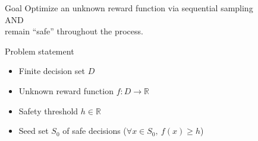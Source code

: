 \documentclass[xetex,10pt,mathserif,handout]{beamer}
\newlength\figureheight
\newlength\figurewidth
\begin{document}

\begin{frame}{Goal}
\centering
\large
Optimize an unknown reward function via sequential sampling\\[1em]
AND\\[1em]
remain ``safe'' throughout the process.
\end{frame}

\begin{frame}{Problem statement}
\begin{itemize}
\item<1-> Finite decision set $D$
\vspace{0.5em}
\item<1-> Unknown reward function $f : D \to \mathbb{R}$
\vspace{0.5em}
\item<2-> Safety threshold $h \in \mathbb{R}$
\vspace{0.5em}
\item<4-> Seed set $S_0$ of safe decisions ($\forall x \in S_0,\ f(x) \geq h$)
\end{itemize}




\end{frame}
\end{document}
